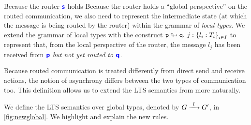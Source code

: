 Because the router ${\color{blue}\bm{\mathsf{s}}}$ holds
Because the router holds a ``global perspective''
on the routed communication, we also need to
represent the intermediate state (at which the message is 
being routed by the router) within the grammar
of \textit{local types}.
We extend the grammar of local types with the construct
${\mathtt{p}} \looparrowright {\mathtt{q}}. ~ {j} : \left\{{l_i: T_i}\right\}_{i \in I}$
to represent that, from the local perspective of
the router, the message $l_j$
has been received from ${\color{blue}\bm{\mathsf{p}}}$ \textit{but not yet routed
to ${\color{blue}\bm{\mathsf{q}}}$}.

Because routed communication is treated differently
from direct send and receive actions, the notion
of asynchrony differs between the two types of communication
too. This definition allows us to extend
the LTS semantics from \cite{characterisation}
more naturally.

We define the LTS semantics 
over global types,
denoted by $\treduce{G}{G'}{l}$,
in \cref{fig:newglobal}.
We highlight and explain the new rules.\\

